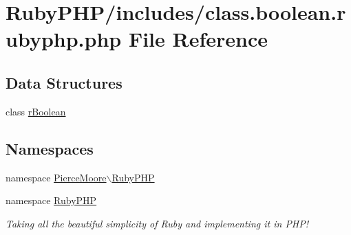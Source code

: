 \hypertarget{class_8boolean_8rubyphp_8php}{\section{Ruby\-P\-H\-P/includes/class.boolean.\-rubyphp.\-php File Reference}
\label{class_8boolean_8rubyphp_8php}
}
\subsection*{Data Structures}
\begin{DoxyCompactItemize}
\item 
class \hyperlink{class_pierce_moore_1_1_ruby_p_h_p_1_1r_boolean}{r\-Boolean}
\end{DoxyCompactItemize}
\subsection*{Namespaces}
\begin{DoxyCompactItemize}
\item 
namespace \hyperlink{namespace_pierce_moore_1_1_ruby_p_h_p}{Pierce\-Moore$\backslash$\-Ruby\-P\-H\-P}
\item 
namespace \hyperlink{namespace_ruby_p_h_p}{Ruby\-P\-H\-P}
\begin{DoxyCompactList}\small\item\em Taking all the beautiful simplicity of Ruby and implementing it in P\-H\-P! \end{DoxyCompactList}\end{DoxyCompactItemize}
